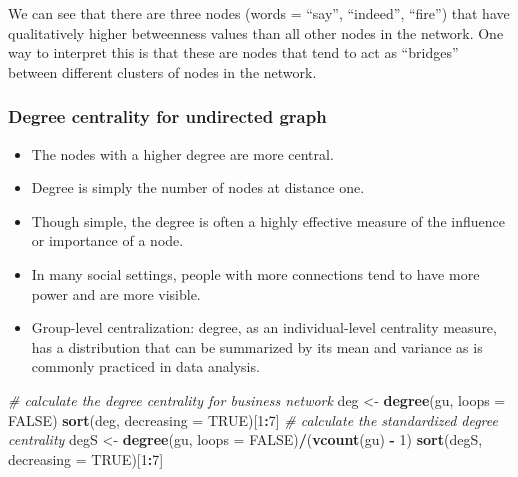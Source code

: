 \documentclass[
]{article}
\newenvironment{Shaded}{\begin{snugshade}}{\end{snugshade}}
\newcommand{\AttributeTok}[1]{\textcolor[rgb]{0.13,0.29,0.53}{#1}}
\newcommand{\CommentTok}[1]{\textcolor[rgb]{0.56,0.35,0.01}{\textit{#1}}}
\newcommand{\ConstantTok}[1]{\textcolor[rgb]{0.56,0.35,0.01}{#1}}
\newcommand{\DecValTok}[1]{\textcolor[rgb]{0.00,0.00,0.81}{#1}}
\newcommand{\FunctionTok}[1]{\textcolor[rgb]{0.13,0.29,0.53}{\textbf{#1}}}
\newcommand{\NormalTok}[1]{#1}
\newcommand{\OtherTok}[1]{\textcolor[rgb]{0.56,0.35,0.01}{#1}}
\newcommand{\SpecialCharTok}[1]{\textcolor[rgb]{0.81,0.36,0.00}{\textbf{#1}}}
\providecommand{\tightlist}{%
  \setlength{\itemsep}{0pt}\setlength{\parskip}{0pt}}
\begin{document}
We can see that there are three nodes (words = ``say'', ``indeed'', ``fire'') that have qualitatively higher betweenness values than all other nodes in the network. One way to interpret this is that these are nodes that tend to act as ``bridges'' between different clusters of nodes in the network.

\hypertarget{degree-centrality-for-undirected-graph}{%
\subsubsection{Degree centrality for undirected graph}\label{degree-centrality-for-undirected-graph}}

\begin{itemize}
\tightlist
\item
  The nodes with a higher degree are more central.
\item
  Degree is simply the number of nodes at distance one.
\item
  Though simple, the degree is often a highly effective measure of the influence or importance of a node.
\item
  In many social settings, people with more connections tend to have more power and are more visible.
\item
  Group-level centralization: degree, as an individual-level centrality measure, has a distribution that can be summarized by its mean and variance as is commonly practiced in data analysis.
\end{itemize}

\footnotesize

\begin{Shaded}
\begin{Highlighting}[]
\CommentTok{\# calculate the degree centrality for business network}
\NormalTok{deg }\OtherTok{\textless{}{-}} \FunctionTok{degree}\NormalTok{(gu, }\AttributeTok{loops =} \ConstantTok{FALSE}\NormalTok{)}
\FunctionTok{sort}\NormalTok{(deg, }\AttributeTok{decreasing =} \ConstantTok{TRUE}\NormalTok{)[}\DecValTok{1}\SpecialCharTok{:}\DecValTok{7}\NormalTok{]}
\CommentTok{\# calculate the standardized degree centrality}
\NormalTok{degS }\OtherTok{\textless{}{-}} \FunctionTok{degree}\NormalTok{(gu, }\AttributeTok{loops =} \ConstantTok{FALSE}\NormalTok{)}\SpecialCharTok{/}\NormalTok{(}\FunctionTok{vcount}\NormalTok{(gu) }\SpecialCharTok{{-}} \DecValTok{1}\NormalTok{)}
\FunctionTok{sort}\NormalTok{(degS, }\AttributeTok{decreasing =} \ConstantTok{TRUE}\NormalTok{)[}\DecValTok{1}\SpecialCharTok{:}\DecValTok{7}\NormalTok{]}
\end{Highlighting}
\end{Shaded}
\end{document}
